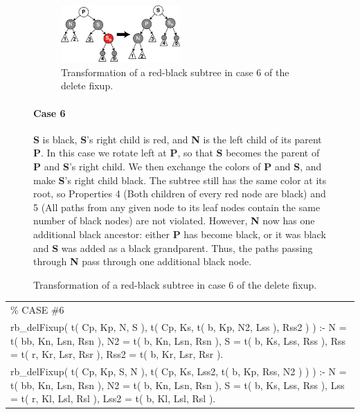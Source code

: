\documentclass{article}
\newenvironment{code}{\obeycr\begin{it}\nopagebreak\addvspace{1ex}\noindent\footnotesize\begin{tabular}{|p{0.95\textwidth}|}\hline}{\\\hline\end{tabular}\par\addvspace{1ex}\end{it}\restorecr}
\begin{document}
\begin{figure}[h]
  \begin{figure}
    \includegraphics[width=0.5\textwidth]{Red-black_tree_delete_case_6}
    \caption{Transformation of a red-black subtree in case 6 of the delete fixup.}
    \label{delFix6}
  \end{figure}
  \paragraph{Case 6}
\textbf{S} is black, \textbf{S}'s right child is red, and \textbf{N} is the left child of its parent \textbf{P}. In this case we rotate left at \textbf{P}, so that \textbf{S} becomes the parent of \textbf{P} and \textbf{S}'s right child. We then exchange the colors of \textbf{P} and \textbf{S}, and make \textbf{S}'s right child black. The subtree still has the same color at its root, so Properties 4 (Both children of every red node are black) and 5 (All paths from any given node to its leaf nodes contain the same number of black nodes) are not violated. However, \textbf{N} now has one additional black ancestor: either \textbf{P} has become black, or it was black and \textbf{S} was added as a black grandparent. Thus, the paths passing through \textbf{N} pass through one additional black node.
\end{figure}

\begin{code}
\% CASE \#6\\
rb\_delFixup( t( Cp, Kp, N, S ), 
\hspace{13ex}t( Cp, Ks, t( b, Kp, N2, Lss ), Rss2 ) ) :-
\hspace{2ex}N = t( bb, Kn, Lsn, Rsn ), 
\hspace{2ex}N2 = t( b, Kn, Lsn, Rsn ),
\hspace{2ex}S = t( b, Ks, Lss, Rss ), 
\hspace{2ex}Rss = t( r, Kr, Lsr, Rsr ),
\hspace{2ex}Rss2 = t( b, Kr, Lsr, Rsr ).\\  
rb\_delFixup( t( Cp, Kp, S, N ), 
\hspace{13ex}t( Cp, Ks, Lss2, t( b, Kp, Rss, N2 ) ) ) :-
\hspace{2ex}N = t( bb, Kn, Lsn, Rsn ), 
\hspace{2ex}N2 = t( b, Kn, Lsn, Rsn ),
\hspace{2ex}S = t( b, Ks, Lss, Rss ), 
\hspace{2ex}Lss = t( r, Kl, Lsl, Rsl ),
\hspace{2ex}Lss2 = t( b, Kl, Lsl, Rsl ).
\end{code}
\end{document}
